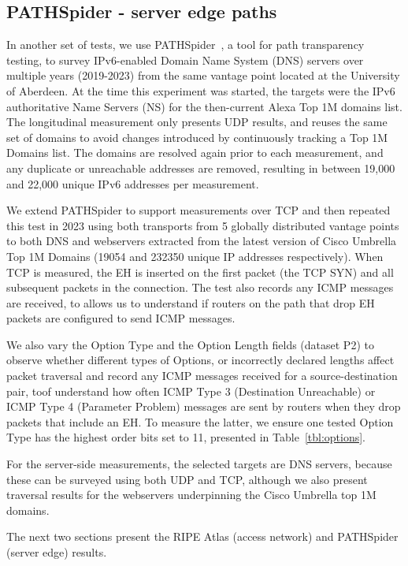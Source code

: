 \documentclass[conference]{IEEEtran}
\begin{document}
    \subsection{PATHSpider - server edge paths}
    \label{sec:pathspider-methodology}

In another set of tests, we use PATHSpider~\cite{learmonth2016pathspider}, a tool for path transparency testing, to survey IPv6-enabled Domain Name System (DNS) servers over multiple years (2019-2023) from the same vantage point located at the University of Aberdeen. At the time this experiment was started, the targets were the IPv6 authoritative Name Servers (NS) for the then-current Alexa Top 1M domains list. The longitudinal measurement only presents UDP results, and reuses the same set of domains to avoid changes introduced by continuously tracking a Top 1M Domains list. The domains are resolved again prior to each measurement, and any duplicate or unreachable addresses are removed, resulting in between 19,000 and 22,000 unique IPv6 addresses per measurement.

We extend PATHSpider to support measurements over TCP and then repeated this test in 2023 using both transports from 5 globally distributed vantage points to both DNS and webservers extracted from the latest version of Cisco Umbrella Top 1M Domains (19054 and 232350 unique IP addresses respectively). When TCP is measured, the EH is inserted on the first packet (the TCP SYN) and all subsequent packets in the connection.
The test also records any ICMP messages are received, to allows us to understand if routers on the path that drop EH packets are configured to send ICMP messages.

We also vary the Option Type and the Option Length fields (dataset P2) to observe whether different types of Options, or incorrectly declared lengths affect packet traversal and record any ICMP messages received
for a source-destination pair, toof understand how often ICMP Type 3 (Destination Unreachable) or ICMP Type 4 (Parameter Problem) messages are sent by routers when they drop packets that include an EH. To measure the latter, we ensure one tested Option Type has the highest order bits set to 11, presented in Table~\ref{tbl:options}.

For the server-side measurements, the selected targets  are DNS servers, because these can be surveyed using both UDP and TCP, although we also present traversal results for the webservers underpinning the Cisco Umbrella top 1M domains.

The next two sections present the RIPE Atlas (access network) and PATHSpider (server edge) results.
\end{document}
